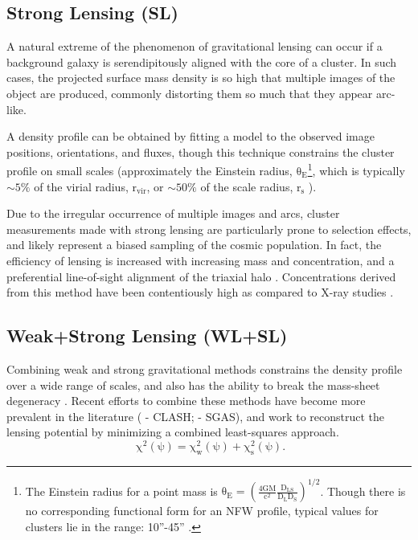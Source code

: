 \subsection{Strong Lensing (SL)}
A natural extreme of the phenomenon of gravitational lensing can occur
if a background galaxy is serendipitously aligned with the core of
a cluster. In such cases, the projected surface mass density is so high that
multiple images of the object are produced, commonly distorting them so much
that they appear arc-like.

A density profile can be obtained by fitting a model to the observed image
positions, orientations, and fluxes, though this technique
constrains the cluster profile on small scales (approximately the Einstein radius,
$\mathrm{ \theta_{E}}$\footnote[1]{The Einstein radius for a point mass is
  $\mathrm{\theta_{E} = \left( \frac{4GM}{c^{2}} \frac{D_{LS}}{D_{L}D_{S}}
    \right)^{1/2}}$. Though there is no corresponding functional form for an
  NFW profile,  typical values for clusters lie in the range: 10''-45''
  \citep{KN03.1,BR05.2}.}, which is typically $\mathrm{\sim 5\%}$ of the virial
radius, $\mathrm{r_{vir}}$, or $\mathrm{\sim 50\%}$ of the scale radius,
$\mathrm{r_{s}}$ \citep{OG09.2}).

Due to the irregular occurrence of multiple images and arcs, cluster
measurements made with strong lensing are particularly prone to selection
effects, and likely represent a biased sampling of the cosmic
population. In fact, the efficiency of lensing is increased with increasing
mass and concentration, and a preferential line-of-sight alignment of the
triaxial halo \citep{OG09.2}. Concentrations derived from this method have been
contentiously high as compared to X-ray studies \citep{CO07.1}.

\subsection{Weak+Strong Lensing (WL+SL)}
Combining weak and strong gravitational methods constrains the density
profile over a wide range of scales, and also has the ability to break the
mass-sheet degeneracy \citep{SC95.1}. Recent efforts to combine these methods
have become more prevalent in the literature (\citet{ME14.1} - 
CLASH; \citet{OG12.1} - SGAS), and work to reconstruct the lensing potential by
minimizing a combined least-squares approach. 
\begin{equation}
\mathrm{\phantom{.} \chi^{2}(\psi) = \chi^{2}_{w}(\psi) + \chi^{2}_{s}(\psi)}.
\end{equation}


